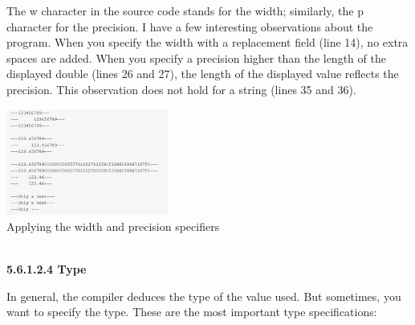 The w character in the source code stands for the width; similarly, the p character for the precision. I have a few interesting observations about the program. When you specify the width with a replacement field (line 14), no extra spaces are added. When you specify a precision higher than the length of the displayed double (lines 26 and 27), the length of the displayed value reflects the precision. This observation does not hold for a string (lines 35 and 36).

\begin{center}
\includegraphics[width=0.4\textwidth]{content/3/chapter5/images/30.png}\\
Applying the width and precision specifiers
\end{center}

\hspace*{\fill} \\ %
\noindent
\textbf{5.6.1.2.4\hspace{0.2cm} Type}

In general, the compiler deduces the type of the value used. But sometimes, you want to specify the type. These are the most important type specifications:

